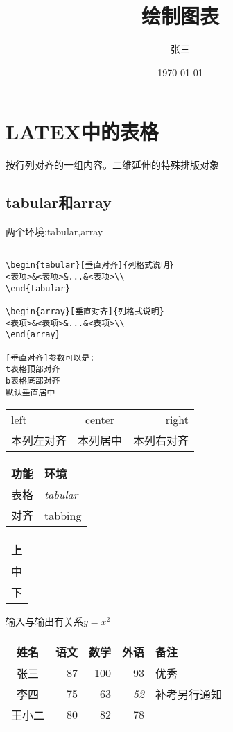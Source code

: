 \documentclass[a4paper, titlepage, hyperref, UTF8]{ctexart}
\title{绘制图表}
\author{张三}
\date{\today}
\begin{document}
\maketitle
\tableofcontents
\newpage

\section{LATEX中的表格}
按行列对齐的一组内容。二维延伸的特殊排版对象
\subsection{tabular和array}
两个环境:tabular,array
\begin{verbatim}

\begin{tabular}[垂直对齐]{列格式说明}
<表项>&<表项>&...&<表项>\\
\end{tabular}

\begin{array}[垂直对齐]{列格式说明}
<表项>&<表项>&...&<表项>\\
\end{array}

[垂直对齐]参数可以是:
t表格顶部对齐
b表格底部对齐
默认垂直居中

\end{verbatim}

\begin{tabular}{lcr}
left & center & right \\
本列左对齐 & 本列居中 & 本列右对齐 \\
\end{tabular}

\begin{tabular}{ll}
\bfseries 功能 & \bfseries 环境 \\
表格 & \sffamily \itshape tabular \\
对齐 & \ttfamily tabbing
\end{tabular}

\begin{tabular}{|l|}
\hline
上 \\
\hline
中 \\
\hline
下 \\
\hline
\end{tabular}
\qquad
输入与输出有关系$y=x^2$

\begin{tabular}{|c|rrr|p{4em}|}
\hline
姓名 & 语文 & 数学 & 外语 & 备注 \\
\hline
张三 & 87 & 100 & 93 & 优秀 \\
李四 & 75 & 63 & \emph{52} & 补考另行通知  \\
王小二 & 80 & 82 & 78 & \\
\hline
\end{tabular}
\end{document}
